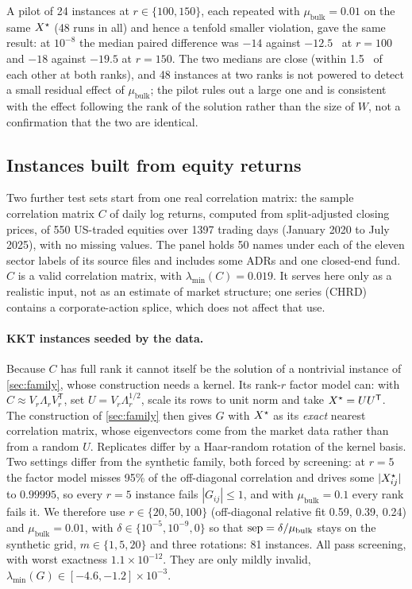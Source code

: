A pilot of 24 instances at $r\in\{100,150\}$, each repeated with
$\mu_{\mathrm{bulk}}=0.01$ on the same $X^\star$ (48 runs in all) and hence a tenfold smaller
violation, gave the same result: at $10^{-8}$ the median paired difference was
$-14$ against $-12.5$ \EVDs\ at $r=100$ and $-18$ against $-19.5$ at $r=150$.
The two medians are close (within 1.5 \EVDs\ of each other at both ranks),
and 48 instances at two ranks is not powered to detect a small residual
effect of $\mu_{\mathrm{bulk}}$; the pilot rules out a large one and is
consistent with the effect following the rank of the solution rather than
the size of $W$, not a confirmation that the two are identical.



\subsection{Instances built from equity returns}\label{sec:thesis}
Two further test sets start from one real correlation matrix: the sample
correlation matrix $C$ of daily log returns, computed from split-adjusted
closing prices, of 550 US-traded equities over 1397 trading days (January 2020
to July 2025), with no missing values. The panel holds 50 names under each of
the eleven sector labels of its source files and includes some ADRs and one
closed-end fund. $C$ is a valid correlation matrix, with
$\lambda_{\min}(C)=0.019$. It serves here only as a realistic input, not as an
estimate of market structure; one series (CHRD) contains a corporate-action
splice, which does not affect that use.

\paragraph{KKT instances seeded by the data.}
Because $C$ has full rank it cannot itself be the solution of a nontrivial
instance of \cref{sec:family}, whose construction needs a kernel. Its rank-$r$
factor model can: with $C\approx V_r\Lambda_rV_r^{\mathsf T}$, set
$U=V_r\Lambda_r^{1/2}$, scale its rows to unit norm and take $X^\star=UU^{\mathsf T}$.
The construction of \cref{sec:family} then gives $G$ with $X^\star$ as its
\emph{exact} nearest correlation matrix, whose eigenvectors come from the
market data rather than from a random $U$. Replicates differ by a Haar-random
rotation of the kernel basis. Two settings differ from the synthetic family,
both forced by screening: at $r=5$ the factor model misses 95\% of the
off-diagonal correlation and drives some $|X^\star_{ij}|$ to $0.99995$, so every
$r=5$ instance fails $|G_{ij}|\le1$, and with $\mu_{\mathrm{bulk}}=0.1$ every
rank fails it. We therefore use $r\in\{20,50,100\}$ (off-diagonal relative fit
0.59, 0.39, 0.24) and $\mu_{\mathrm{bulk}}=0.01$, with
$\delta\in\{10^{-5},10^{-9},0\}$ so that $\mathrm{sep}=\delta/\mu_{\mathrm{bulk}}$ stays
on the synthetic grid, $m\in\{1,5,20\}$ and three rotations: 81 instances. All
pass screening, with worst exactness $1.1\times10^{-12}$. They are only mildly
invalid, $\lambda_{\min}(G)\in[-4.6,-1.2]\times10^{-3}$.

